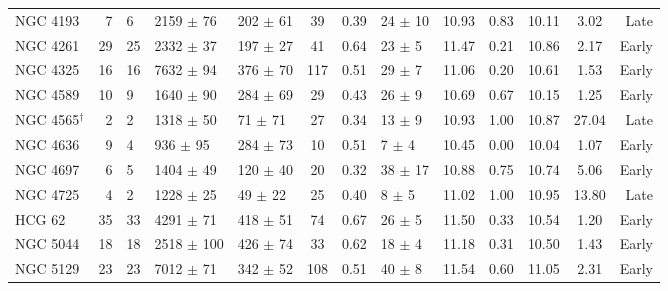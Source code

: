 \begin{table*}
\begin{center}
\begin{tabular}{@{}lr@{\hspace{0.1cm}}lllccl@{\hspace{0.2cm}}ccc@{\hspace{0.2cm}}c@{\hspace{0.2cm}}r@{}}
NGC 4193              &  7   &  6                     &  2159 $\pm$ 76   &  202 $\pm$ 61   &  39        &  0.39      &  24   $\pm$ 10  &  10.93          &  0.83  &  10.11          &  3.02   &  Late     \\
NGC 4261              &  29  &  25                    &  2332 $\pm$ 37   &  197 $\pm$ 27   &  41        &  0.64      &  23   $\pm$ 5   &  11.47          &  0.21  &  10.86          &  2.17   &  Early    \\
NGC 4325              &  16  &  16                    &  7632 $\pm$ 94   &  376 $\pm$ 70   &  117       &  0.51      &  29   $\pm$ 7   &  11.06          &  0.20  &  10.61          &  1.53   &  Early    \\
NGC 4589              &  10  &  9                     &  1640 $\pm$ 90   &  284 $\pm$ 69   &  29        &  0.43      &  26   $\pm$ 9   &  10.69          &  0.67  &  10.15          &  1.25   &  Early    \\
NGC 4565$^{\dagger}$  &  2   &  2                     &  1318 $\pm$ 50   &  71  $\pm$ 71   &  27        &  0.34      &  13   $\pm$ 9   &  10.93          &  1.00  &  10.87          &  27.04  &  Late     \\
NGC 4636              &  9   &  4                     &  936  $\pm$ 95   &  284 $\pm$ 73   &  10        &  0.51      &  7    $\pm$ 4   &  10.45          &  0.00  &  10.04          &  1.07   &  Early    \\
NGC 4697              &  6   &  5                     &  1404 $\pm$ 49   &  120 $\pm$ 40   &  20        &  0.32      &  38   $\pm$ 17  &  10.88          &  0.75  &  10.74          &  5.06   &  Early    \\
NGC 4725              &  4   &  2                     &  1228 $\pm$ 25   &  49  $\pm$ 22   &  25        &  0.40      &  8    $\pm$ 5   &  11.02          &  1.00  &  10.95          &  13.80  &  Late     \\
HCG 62                &  35  &  33                    &  4291 $\pm$ 71   &  418 $\pm$ 51   &  74        &  0.67      &  26   $\pm$ 5   &  11.50          &  0.33  &  10.54          &  1.20   &  Early    \\
NGC 5044              &  18  &  18                    &  2518 $\pm$ 100  &  426 $\pm$ 74   &  33        &  0.62      &  18   $\pm$ 4   &  11.18          &  0.31  &  10.50          &  1.43   &  Early    \\
NGC 5129              &  23  &  23                    &  7012 $\pm$ 71   &  342 $\pm$ 52   &  108       &  0.51      &  40   $\pm$ 8   &  11.54          &  0.60  &  11.05          &  2.31   &  Early    \\

\end{tabular}
\end{center}
\end{table*}
